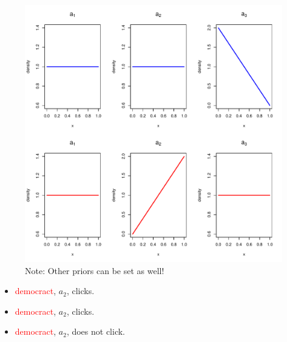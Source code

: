 \documentclass{beamer}
\begin{document}
\begin{frame}
  \begin{figure}
    \includegraphics[scale=.5]{b3.pdf}
    \caption{Note: Other priors can be set as well!}
  \end{figure}
\end{frame}

\begin{frame}
  \begin{itemize}
    \item{\textcolor{red}{democract}, $a_2$,  clicks.}
    \item{\textcolor{red}{democract}, $a_2$,  clicks.}
    \item{\textcolor{red}{democract}, $a_2$,  does not click.}
  \end{itemize}
\end{frame}
\end{document}
